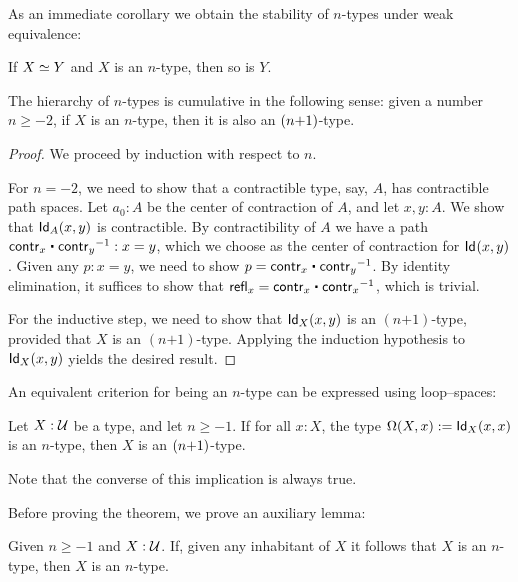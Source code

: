 As an immediate corollary we obtain the stability of $n$-types under weak equivalence:

\begin{cor}\label{cor:preservation-hlevels-weq}
 If $\eqv{X}{Y}$ and $X$ is an $n$-type, then so is $Y$.
\end{cor}

\begin{thm}\label{thm:hlevel-cumulative}
 The hierarchy of $n$-types is cumulative in the following sense:
   given a number $n \geq -2$, if $X$ is an $n$-type, then it is also an $(n\mbox{\rm{+}}1)$-type.
\end{thm}

\begin{proof}
 We proceed by induction with respect to $n$.

 For $n = -2$, we need to show that a contractible type, say, $A$, has contractible path spaces.
       Let $a_0: A$ be the center of contraction of $A$, and let $x, y : A$. We show that $\idtype[A]{x}{y}$
       is contractible.
       By contractibility of $A$ we have a path $\contr_x \ct \opp{\contr_y} : x = y$, which we choose as
       the center of contraction for $\idtype{x}{y}$.
       Given any $p : x = y$, we need to show $p = \contr_x \ct \opp{\contr_y}$.
           By identity elimination, it suffices to show that
        $\refl{x} = \contr_x \ct \opp{\contr_x}$, which is trivial.

 For the inductive step, we need to show that $\idtype[X]{x}{y}$ is an $(n\mbox{+}1)$-type, provided
          that $X$ is an $(n\mbox{+}1)$-type. Applying the induction hypothesis to $\idtype[X]{x}{y}$
         yields the desired result.
\end{proof}

An equivalent criterion for being an $n$-type can be expressed using loop--spaces:

\begin{thm}\label{thm:hlevel-loops}
 Let $X : \type$ be a type, and let $n\geq -1$.
  If for all $x : X$, the type $\Omega(X, x) := \idtype[X]{x}{x}$ is an $n$-type,
       then $X$ is an $(n\mbox{\rm{+}}1)$-type.
\end{thm}

Note that the converse of this implication is always true.

Before proving the theorem, we prove an auxiliary lemma:

\begin{lem}\label{lem:hlevel-if-inhab-hlevel}
 Given $n \geq -1$ and $X : \type$. If, given any inhabitant of $X$ it follows that $X$ is
   an $n$-type, then $X$ is an $n$-type.
\end{lem}

